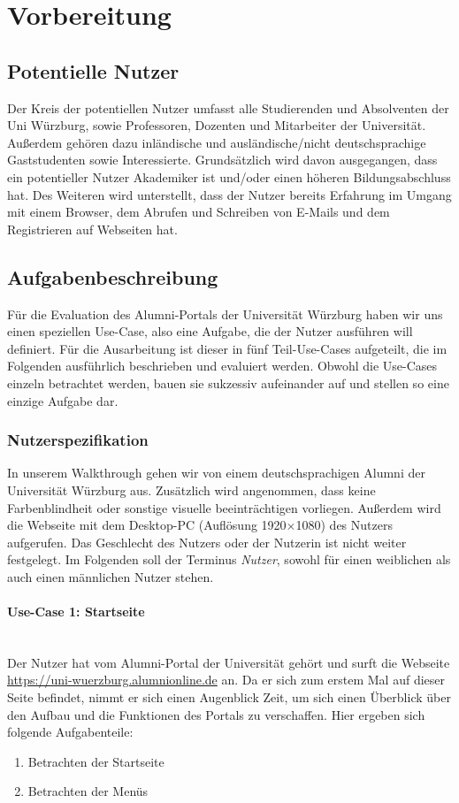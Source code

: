 \section{Vorbereitung}
\subsection{Potentielle Nutzer}
Der Kreis der potentiellen Nutzer umfasst alle Studierenden und Absolventen der Uni Würzburg, sowie Professoren, Dozenten und Mitarbeiter der Universität. Außerdem gehören dazu inländische und ausländische/nicht deutschsprachige Gaststudenten sowie Interessierte. Grundsätzlich wird davon ausgegangen, dass ein potentieller Nutzer Akademiker ist und/oder einen höheren Bildungsabschluss hat. Des Weiteren wird unterstellt, dass der Nutzer bereits Erfahrung im Umgang mit einem Browser, dem Abrufen und Schreiben von E-Mails und dem Registrieren auf Webseiten hat. 

\subsection{Aufgabenbeschreibung}
Für die Evaluation des Alumni-Portals der Universität Würzburg haben wir uns einen speziellen Use-Case, also eine Aufgabe, die der Nutzer ausführen will definiert. 
Für die Ausarbeitung ist dieser in fünf Teil-Use-Cases aufgeteilt, die im Folgenden ausführlich beschrieben und evaluiert werden. Obwohl die Use-Cases einzeln betrachtet werden, bauen sie sukzessiv aufeinander auf und stellen so eine einzige Aufgabe dar.

\subsubsection*{Nutzerspezifikation}
In unserem Walkthrough gehen wir von einem deutschsprachigen Alumni der Universität Würzburg aus. Zusätzlich wird angenommen, dass keine Farbenblindheit oder sonstige visuelle beeinträchtigen vorliegen. 
Außerdem wird die Webseite mit dem Desktop-PC (Auflösung 1920$\times$1080) des Nutzers aufgerufen. 
Das Geschlecht des Nutzers oder der Nutzerin ist nicht weiter festgelegt. Im Folgenden soll der Terminus \emph{Nutzer}, sowohl für einen weiblichen als auch einen männlichen Nutzer stehen.

\paragraph{Use-Case 1: Startseite}\quad\\
Der Nutzer hat vom Alumni-Portal der Universität gehört und surft die Webseite \url{https://uni-wuerzburg.alumnionline.de} an. Da er sich zum erstem Mal auf dieser Seite befindet, nimmt er sich einen Augenblick Zeit, um sich einen Überblick über den Aufbau und die Funktionen des Portals zu verschaffen.
Hier ergeben sich folgende Aufgabenteile:
\begin{enumerate}

		\item Betrachten der Startseite
		\item Betrachten der Menüs
\end{enumerate}

